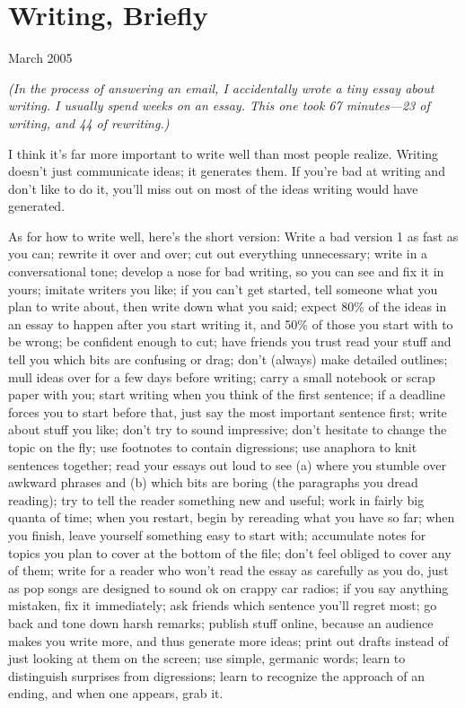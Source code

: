 \chapter{Writing,  Briefly}

March 2005

\emph{(In the process of answering an email, I accidentally wrote a tiny
essay about writing. I usually spend weeks on an essay. This one took 67
minutes---23 of writing, and 44 of rewriting.)}

I think it's far more important to write well than most people realize.
Writing doesn't just communicate ideas; it generates them. If you're bad
at writing and don't like to do it, you'll miss out on most of the ideas
writing would have generated.

As for how to write well, here's the short version: Write a bad version
1 as fast as you can; rewrite it over and over; cut out everything
unnecessary; write in a conversational tone; develop a nose for bad
writing, so you can see and fix it in yours; imitate writers you like;
if you can't get started, tell someone what you plan to write about,
then write down what you said; expect 80\% of the ideas in an essay to
happen after you start writing it, and 50\% of those you start with to
be wrong; be confident enough to cut; have friends you trust read your
stuff and tell you which bits are confusing or drag; don't (always) make
detailed outlines; mull ideas over for a few days before writing; carry
a small notebook or scrap paper with you; start writing when you think
of the first sentence; if a deadline forces you to start before that,
just say the most important sentence first; write about stuff you like;
don't try to sound impressive; don't hesitate to change the topic on the
fly; use footnotes to contain digressions; use anaphora to knit
sentences together; read your essays out loud to see (a) where you
stumble over awkward phrases and (b) which bits are boring (the
paragraphs you dread reading); try to tell the reader something new and
useful; work in fairly big quanta of time; when you restart, begin by
rereading what you have so far; when you finish, leave yourself
something easy to start with; accumulate notes for topics you plan to
cover at the bottom of the file; don't feel obliged to cover any of
them; write for a reader who won't read the essay as carefully as you
do, just as pop songs are designed to sound ok on crappy car radios; if
you say anything mistaken, fix it immediately; ask friends which
sentence you'll regret most; go back and tone down harsh remarks;
publish stuff online, because an audience makes you write more, and thus
generate more ideas; print out drafts instead of just looking at them on
the screen; use simple, germanic words; learn to distinguish surprises
from digressions; learn to recognize the approach of an ending, and when
one appears, grab it.